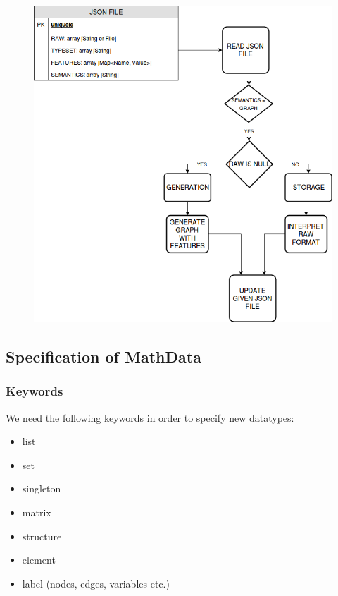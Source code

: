 \documentclass[12pt,twoside]{article}
\begin{document}
		\begin{figure}
			\centering
			\includegraphics[width=\linewidth]{figures/mdlanguage.png}
		\end{figure}
		
		\subsection*{Specification of MathData}
		\subsubsection*{Keywords}
		We need the following keywords in order to specify new datatypes:
		
		\begin{itemize}
			\item list
			\item set
			\item singleton
			\item matrix
			\item structure
			\item element
			\item label (nodes, edges, variables etc.)
		\end{itemize}
	
\end{document}
